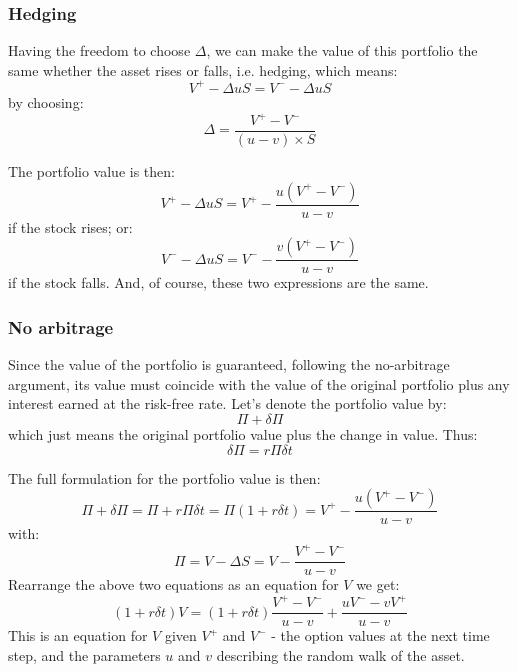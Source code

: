 \subsubsection{Hedging}
Having the freedom to choose $\Delta$, we can make the value of this portfolio the same whether the asset rises or falls, i.e. hedging, which means:
\begin{equation}
    V^+ - \Delta u S = V^- - \Delta u S
\end{equation}
by choosing:
\begin{equation}
    \Delta = \frac{V^+ - V^-}{(u-v) \times S}
\end{equation}

The portfolio value is then:
\begin{equation}
    V^+ - \Delta u S = V^+ - \frac{u(V^+ - V^-)}{u-v}
\end{equation}
if the stock rises; or:
\begin{equation}
    V^- - \Delta u S = V^- - \frac{v(V^+ - V^-)}{u-v}
\end{equation}
if the stock falls. And, of course, these two expressions are the same.



\subsubsection{No arbitrage}
Since the value of the portfolio is guaranteed, following the no-arbitrage argument, its value must coincide with the value of the original portfolio plus any interest earned at the risk-free rate. Let's denote the portfolio value by:
\begin{equation}
    \Pi + \delta \Pi
\end{equation}
which just means the original portfolio value plus the change in value. Thus:
\begin{equation}
    \delta \Pi = r \Pi \delta t
\end{equation}

The full formulation for the portfolio value is then:
\begin{equation}
    \Pi + \delta \Pi = \Pi + r \Pi \delta t = \Pi (1 + r \delta t) = V^+ - \frac{u(V^+ - V^-)}{u-v}
\end{equation}
with:
\begin{equation}
    \Pi = V - \Delta S = V - \frac{V^+ - V^-}{u-v}
\end{equation}
Rearrange the above two equations as an equation for $V$ we get:
\begin{equation}
    (1 + r \delta t)V = (1 + r \delta t) \frac{V^+ - V^-}{u-v} + \frac{uV^- - vV^+}{u-v}
\end{equation}
This is an equation for $V$ given $V^+$ and $V^-$ - the option values at the next time step, and the parameters $u$ and $v$ describing the random walk of the asset. 

